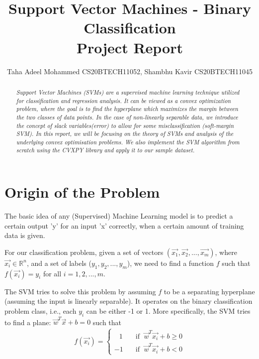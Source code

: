 \documentclass[journal]{IEEEtran}
\title {Support Vector Machines - Binary Classification \\[1ex] \large Project Report}
\author{Taha Adeel Mohammed  {\small CS20BTECH11052}, Shambhu Kavir {\small CS20BTECH11045}  }
\begin{document}
\maketitle

\begin{abstract} \it{
    Support Vector Machines (SVMs) are a supervised machine learning technique utilized for classification and regression analysis. It can be viewed as a convex optimization problem, where the goal is to find the hyperplane which maximizes the margin between the two classes of data points. In the case of non-linearly separable data, we introduce the concept of slack variables(error) to allow for some misclassification (soft-margin SVM). In this report, we will be focusing on the theory of SVMs and analysis of the underlying convex optimisation problems. We also implement the SVM algorithm from scratch using the CVXPY library and apply it to our sample dataset.
}
\end{abstract}

\section{\textbf{Origin of the Problem}}
The basic idea of any (Supervised) Machine Learning model is to predict a certain output 'y' for an input 'x' correctly, when a certain amount of training data is given. 
\newline

For our classification problem, given a set of vectors $(\vec{x_1}, \vec{x_2}, ..., \vec{x_m})$, where $\vec{x_i} \in \mathbb{R}^n$, and a set of labels ($y_1, y_2, ..., y_m$), we need to find a function $f$ such that $f(\vec{x_i}) = y_i$ for all $i = 1, 2, ..., m$. 
\newline


The SVM tries to solve this problem by assuming $f$ to be a separating hyperplane (assuming the input is linearly separable). It operates on the binary classification problem class, i.e., each $y_i$ can be either -1 or 1. More specifically, the SVM tries to find a plane: $\vec{w}^T\vec{x} + b = 0$ such that
\begin{align}
    f(\vec{x_i}) =
    \begin{cases}
        \,\;\;1 \quad   &\text{if }\; \vec{w}^T\vec{x_i} + b \geq 0 \\
        -1      \quad   &\text{if }\; \vec{w}^T\vec{x_i} + b < 0
    \end{cases}
\end{align}
\end{document}

